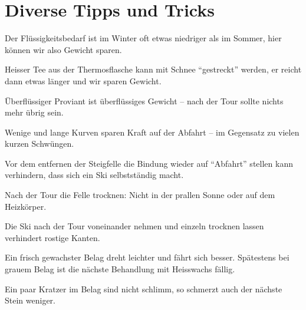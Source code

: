 \section{Diverse Tipps und Tricks}

Der Flüssigkeitsbedarf ist im Winter oft etwas niedriger als im Sommer, hier können wir also Gewicht sparen.

Heisser Tee aus der Thermosflasche kann mit Schnee \enquote{gestreckt} werden, er reicht dann etwas länger und wir sparen Gewicht.

Überflüssiger Proviant ist überflüssiges Gewicht -- nach der Tour sollte nichts mehr übrig sein.

Wenige und lange Kurven sparen Kraft auf der Abfahrt -- im Gegensatz zu vielen kurzen Schwüngen.

Vor dem entfernen der Steigfelle die Bindung wieder auf \enquote{Abfahrt} stellen kann verhindern, dass sich ein Ski selbstständig macht.

Nach der Tour die Felle trocknen: Nicht in der prallen Sonne oder auf dem Heizkörper.

Die Ski nach der Tour voneinander nehmen und einzeln trocknen lassen verhindert rostige Kanten.

Ein frisch gewachster Belag dreht leichter und fährt sich besser.
Spätestens bei grauem Belag ist die nächste Behandlung mit Heisswachs fällig.

Ein paar Kratzer im Belag sind nicht schlimm, so schmerzt auch der nächste Stein weniger.
